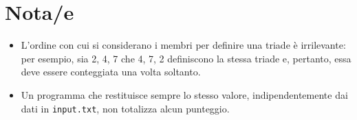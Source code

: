 \documentclass[a4paper,11pt]{article}
\begin{document}
\section*{Nota/e}
\begin{itemize}
  
    \item  
L'ordine con cui si considerano i membri per definire una triade
è irrilevante: per esempio, sia 2, 4, 7 che 4, 7, 2 definiscono
la stessa triade e, pertanto, essa deve essere conteggiata una
volta soltanto.
    \item Un programma che restituisce sempre lo stesso valore,
indipendentemente dai dati in \texttt{input.txt}, non totalizza
alcun punteggio.
\end{itemize}
\end{document}
